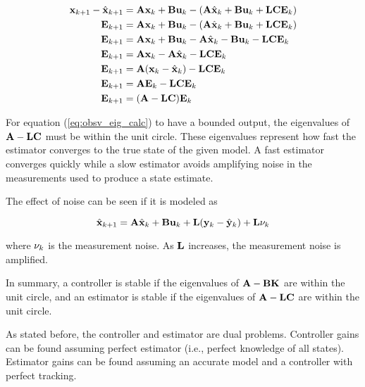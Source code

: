 \begin{align}
  \mathbf{x}_{k+1} - \hat{\mathbf{x}}_{k+1} &= \mathbf{A}\mathbf{x}_k + \mathbf{B}\mathbf{u}_k -
    (\mathbf{A}\hat{\mathbf{x}}_k + \mathbf{B}\mathbf{u}_k +
     \mathbf{L}\mathbf{C}\mathbf{E}_k) \nonumber \\
  \mathbf{E}_{k+1} &= \mathbf{A}\mathbf{x}_k + \mathbf{B}\mathbf{u}_k -
    (\mathbf{A}\hat{\mathbf{x}}_k + \mathbf{B}\mathbf{u}_k + \mathbf{L}\mathbf{C}\mathbf{E}_k)
    \nonumber \\
  \mathbf{E}_{k+1} &= \mathbf{A}\mathbf{x}_k + \mathbf{B}\mathbf{u}_k -
    \mathbf{A}\hat{\mathbf{x}}_k - \mathbf{B}\mathbf{u}_k - \mathbf{L}\mathbf{C}\mathbf{E}_k
    \nonumber \\
  \mathbf{E}_{k+1} &= \mathbf{A}\mathbf{x}_k - \mathbf{A}\hat{\mathbf{x}}_k -
    \mathbf{L}\mathbf{C}\mathbf{E}_k \nonumber \\
  \mathbf{E}_{k+1} &= \mathbf{A}(\mathbf{x}_k - \hat{\mathbf{x}}_k) -
    \mathbf{L}\mathbf{C}\mathbf{E}_k \nonumber \\
  \mathbf{E}_{k+1} &= \mathbf{A}\mathbf{E}_k - \mathbf{L}\mathbf{C}\mathbf{E}_k \nonumber \\
  \mathbf{E}_{k+1} &= (\mathbf{A} - \mathbf{L}\mathbf{C})\mathbf{E}_k \label{eq:obsv_eig_calc}
\end{align}

For equation (\ref{eq:obsv_eig_calc}) to have a bounded output, the eigenvalues
of $\mathbf{A} - \mathbf{L}\mathbf{C}$ must be within the unit circle. These eigenvalues
represent how fast the estimator converges to the true state of the given
\gls{model}. A fast estimator converges quickly while a slow estimator avoids
amplifying noise in the measurements used to produce a state estimate.

The effect of noise can be seen if it is modeled
 as

\begin{equation*}
  \hat{\mathbf{x}}_{k+1} = \mathbf{A}\hat{\mathbf{x}}_k + \mathbf{B}\mathbf{u}_k +
    \mathbf{L} (\mathbf{y}_k - \hat{\mathbf{y}}_k) + \mathbf{L}\mathbf{\nu}_k
\end{equation*}

where $\mathbf{\nu}_k$ is the measurement noise. As $\mathbf{L}$ increases, the
measurement noise is amplified.

In summary, a controller is stable if the eigenvalues of
$\mathbf{A} - \mathbf{B}\mathbf{K}$ are within the unit circle, and an estimator is
stable if the eigenvalues of $\mathbf{A} - \mathbf{L}\mathbf{C}$ are within the unit
circle.

As stated before, the controller and estimator are dual problems. Controller
gains can be found assuming perfect estimator (i.e., perfect knowledge of all
\glspl{state}). Estimator gains can be found assuming an accurate \gls{model}
and a controller with perfect \gls{tracking}.
